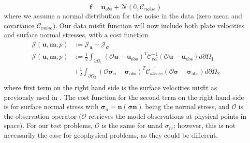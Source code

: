 \documentclass[12pt]{article}
\newcommand{\mm}{{\ensuremath{\boldsymbol{m}}}}
\newcommand{\uu}{{\ensuremath{\boldsymbol{u}}}}
\newcommand{\ff}{{\ensuremath{\boldsymbol{f}}}}
\newcommand{\ssigma}{{\ensuremath{\boldsymbol{\sigma}}}}
\begin{document}
\begin{equation}
\ff = \uu_{obs} + \mathcal{N}(0,\mathcal{C}_{noise})
\end{equation}
where we assume a normal distribution for the noise in the data (zero mean and covariance $\mathcal{C}_{noise}$).
Our data misfit function will now include both plate velocities and surface normal stresses, with a cost function
\begin{equation}
\begin{split}
  \mathcal{J}(\uu,\mm,p)&:= \mathcal{J}_{\uu} + \mathcal{J}_{\ssigma} \\
  \mathcal{J}(\uu,\mm,p)&:= \frac{1}{2}\int_{\partial \Omega_1} (\mathcal{O}\uu-\uu_{\text{obs}})^T\mathcal{C}^{-1}_{vel}(\mathcal{O}\uu-\uu_{\text{obs}})d\partial\Omega_1 \\ 
   &+ \frac{1}{2}\int_{\partial\Omega_2} (\mathcal{O}\ssigma_n-\ssigma_{\text{obs}})^T\mathcal{C}^{-1}_{stress}(\mathcal{O}\ssigma -\ssigma_{\text{obs}})d\partial\Omega_2 \\ 
\end{split}
\end{equation}
where first term on the right hand side is the surface velocities misfit as previously used in \citep{ratnaswamy2015adjoint}. The cost function for the second term on the right hand side is for surface normal stress with $\ssigma_n = \textbf{n}(\ssigma \textbf{n})$ being the normal stress, and $\mathcal{O}$ is the observation operator ($\mathcal{O}$ retrieves the model observations at physical points in space). For our test problems, $\mathcal{O}$ is the same for \uu and $\sigma_{rr}$; however, this is not necessarily the case for geophysical problems, as they could be different.
 
\end{document}
